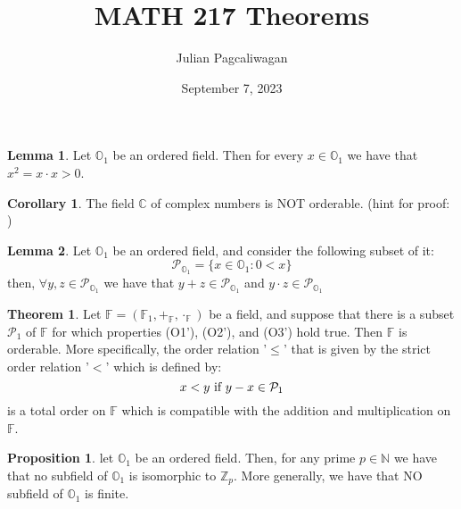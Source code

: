 \documentclass{report}
\title{MATH 217 Theorems}
\author{Julian Pagcaliwagan}
\date{September 7, 2023}
\theoremstyle{definition}
\newtheorem{t1}{Theorem}
\newtheorem{lem}{Lemma}
\newtheorem{coro}{Corollary}
\newtheorem{prop}{Proposition}
\begin{document}
\maketitle

\begin{lem}
    Let $\mathbb{O}_1$ be an ordered field. Then for every $ x \in \mathbb{O}_1 
     $ we have that $ x^2 = x \cdot x > 0  $.
\end{lem}

\begin{coro}
    The field $\mathbb{C}$ of complex numbers is NOT orderable. (hint for proof: )
\end{coro}

\begin{lem}
    Let $  \mathbb{O}_1 $ be an ordered field, and consider the following subset of it:
    \begin{equation*}
        \mathcal{P}_{\mathbb{O}_1} = \{ x \in \mathbb{O}_1: 0 < x\}
    \end{equation*}
    then, $\forall y, z \in \mathcal{P}_{\mathbb{O}_1}  $ we have that
    $ y + z \in \mathcal{P}_{\mathbb{O}_1}  $ and $ y \cdot z \in \mathcal{P}_{\mathbb{O}_1}  $
\end{lem}

\begin{t1}
    Let $ \mathbb{F} = (\mathbb{F}_1, +_\mathbb{F}, \cdot_\mathbb{F})  $ be a field,
    and suppose that there is a subset $ \mathcal{P}_1 $ of $\mathbb{F}$ for which properties
    (O1'), (O2'), and (O3') hold true. Then $\mathbb{F}$ is orderable. More specifically, the order relation
    '$\leq$' that is given by the strict order relation '$<$' which is defined by:
    \begin{equation*}
        x < y \textnormal{ if } y - x \in \mathcal{P}_1
    \end{equation*}
    is a total order on $\mathbb{F}$ which is compatible with the addition and multiplication
    on $\mathbb{F}$.
\end{t1}

\begin{prop}
    let $\mathbb{O}_1$ be an ordered field. Then, for any prime $p \in \mathbb{N}$ we have that
    no subfield of $\mathbb{O}_1$ is isomorphic to $\mathbb{Z}_p$. More generally, 
    we have that NO subfield of $\mathbb{O}_1$ is finite. 
\end{prop}
\end{document}
